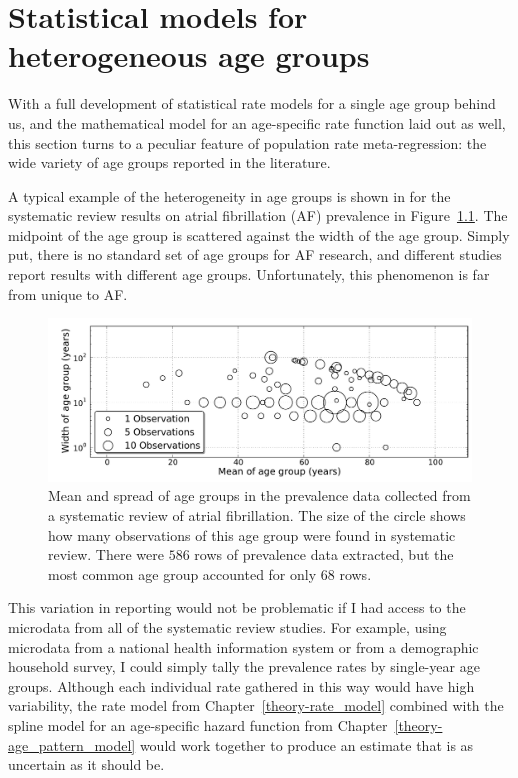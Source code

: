 \chapter{Statistical models for heterogeneous age groups}
\label{chap:age_group_model}
With a full development of statistical rate models for a single age
group behind us, and the mathematical model for an age-specific rate
function laid out as well, this section turns to a peculiar feature of
population rate meta-regression: the wide variety of age groups reported
in the literature.

A typical example of the heterogeneity in age groups is shown in for
the systematic review results on atrial fibrillation (AF)
prevalence\cite{TK_AF_report_reference} in
Figure~\ref{age-group-model-af-age-groups}.  The midpoint of the age
group is scattered against the width of the age group.  Simply put,
there is no standard set of age groups for AF research, and different
studies report results with different age groups. Unfortunately, this
phenomenon is far from unique to AF.

\begin{figure}[h]
\begin{center}
\includegraphics[width=\textwidth]{af_age_groups_scatter.pdf}
\end{center}
\caption{Mean and spread of age groups in the prevalence data
  collected from a systematic review of atrial fibrillation. The
  size of the circle shows how many observations of this age group
  were found in systematic review. There were
  $586$ rows of prevalence data
  extracted, but the most common age group accounted for only
  $68$ rows.}
\label{age-group-model-af-age-groups}
\end{figure}

This variation in reporting would not be problematic if I had access
to the microdata from all of the systematic review studies.  For
example, using microdata from a national health information system or
from a demographic household survey, I could simply tally the
prevalence rates by single-year age groups.  Although each individual
rate gathered in this way would have high variability, the rate model
from Chapter~\ref{theory-rate_model} combined with the spline model
for an age-specific hazard function from Chapter~\ref{theory-age_pattern_model} would
work together to produce an estimate that is as uncertain as it should be.

